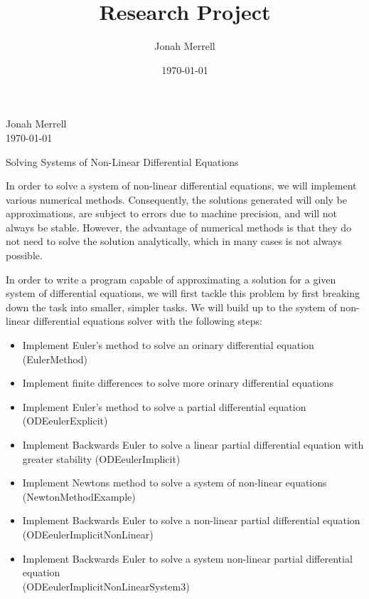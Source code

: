 \documentclass[11pt]{article}
\title{Research Project}
\author{Jonah Merrell}
\date{\today}
\begin{document}
\begin{flushright}
Jonah Merrell \\ 
\today \\
\end{flushright}

\begin{center}
{\LARGE Solving Systems of Non-Linear Differential Equations}
\end{center}

In order to solve a system of non-linear differential equations, we will implement various numerical methods. Consequently, the solutions generated will only be approximations, are subject to errors due to machine precision, and will not always be stable. However, the advantage of numerical methods is that they do not need to solve the solution analytically, which in many cases is not always possible.

In order to write a program capable of approximating a solution for a given system of differential equations, we will first tackle this problem by first breaking down the task into smaller, simpler tasks. We will build up to the system of non-linear differential equations solver with the following steps:
\begin{itemize}

\item Implement Euler's method to solve an orinary differential equation (EulerMethod)
\item Implement finite differences to solve more orinary differential equations 
\item Implement Euler's method to solve a partial differential equation (ODEeulerExplicit)
\item Implement Backwards Euler to solve a linear partial differential equation with greater stability (ODEeulerImplicit)
\item Implement Newtons method to solve a system of non-linear equations (NewtonMethodExample)
\item Implement Backwards Euler to solve a non-linear partial differential equation (ODEeulerImplicitNonLinear)
\item Implement Backwards Euler to solve a system non-linear partial differential equation \\ (ODEeulerImplicitNonLinearSystem3)
\end{itemize}
\end{document}
